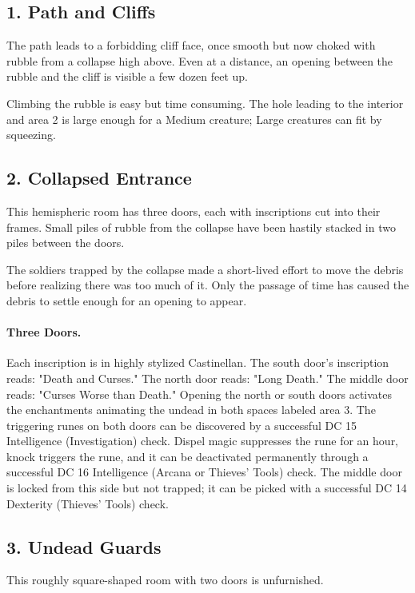 \documentclass[10pt,a4paper,twoside,twocolumn,openany,bg=print,nodeprecatedcode]{dndbook}
\begin{document}
\subsection{1. Path and Cliffs}
\begin{DndReadAloud}{}
The path leads to a forbidding cliff face, once smooth but now choked with rubble from a collapse high above. Even at a distance, an opening between the rubble and the cliff is visible a few dozen feet up.
\end{DndReadAloud}

Climbing the rubble is easy but time consuming. The hole leading to the interior and area 2 is large enough for a Medium creature; Large creatures can fit by squeezing.
\subsection{2. Collapsed Entrance}
\begin{DndReadAloud}{}
This hemispheric room has three doors, each with inscriptions cut into their frames. Small piles of rubble from the collapse have been hastily stacked in two piles between the doors.
\end{DndReadAloud}

The soldiers trapped by the collapse made a short-lived effort to move the debris before realizing there was too much of it. Only the passage of time has caused the debris to settle enough for an opening to appear.
\paragraph{Three Doors.}
Each inscription is in highly stylized Castinellan. The south door's inscription reads: "Death and Curses." The north door reads: "Long Death." The middle door reads: "Curses Worse than Death." Opening the north or south doors activates the enchantments animating the undead in both spaces labeled area 3. The triggering runes on both doors can be discovered by a successful DC 15 Intelligence (Investigation) check. Dispel magic suppresses the rune for an hour, knock triggers the rune, and it can be deactivated permanently through a successful DC 16 Intelligence (Arcana or Thieves' Tools) check. The middle door is locked from this side but not trapped; it can be picked with a successful DC 14 Dexterity (Thieves' Tools) check.
\subsection{3. Undead Guards}
\begin{DndReadAloud}{}
This roughly square-shaped room with two doors is unfurnished.
\end{DndReadAloud}
\end{document}
